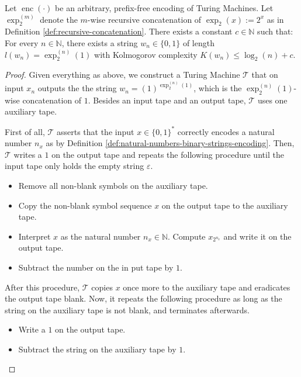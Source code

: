 \begin{lemma}
	\label{lemma:arbitrarycompress}
	Let $\operatorname{enc}(\cdot)$ be an arbitrary, prefix-free encoding of Turing Machines.
	Let $\exp_2^{(m)}$ denote the $m$-wise recursive concatenation of $\exp_2(x):=2^x$ as in Definition \ref{def:recursive-concatenation}.
	There exists a constant $c\in\mathbb{N}$ such that:
	For every $n\in\mathbb{N}$, there exists a string $w_n\in\{0,1\}$ of length $l(w_n)=\exp_2^{(n)}(1)$ with Kolmogorov complexity $K(w_n)\leq \log_2(n) + c$.
\end{lemma}
\begin{proof}
	Given everything as above, we construct a Turing Machine $\mathcal{T}$ that on input $x_n$ outputs the the string $w_n=(1)^{\exp_2^{(n)}(1)}$, which is the $\exp_2^{(n)}(1)$-wise concatenation of $1$. 
	Besides an input tape and an output tape, $\mathcal{T}$ uses one auxiliary tape.
	
	First of all, $\mathcal{T}$ asserts that the input $x\in\{0,1\}^{*}$ correctly encodes a natural number $n_x$ as by Definition \ref{def:natural-numbers-binary-strings-encoding}.
	Then, $\mathcal{T}$ writes a $1$ on the output tape and repeats the following procedure until the input tape only holds the empty string $\varepsilon$.
	
	\begin{itemize}
		\item Remove all non-blank symbols on the auxiliary tape.
		\item Copy the non-blank symbol sequence $x$ on the output tape to the auxiliary tape.
		\item Interpret $x$ as the natural number $n_x\in\mathbb{N}$. Compute $x_{2^{n_x}}$ and write it on the output tape.
		\item Subtract the number on the in
		put tape by $1$.
	\end{itemize}
	
	After this procedure, $\mathcal{T}$ copies $x$ once more to the auxiliary tape and eradicates the output tape blank. 
	Now, it repeats the following procedure as long as the string on the auxiliary tape is not blank, and terminates afterwards.
	\begin{itemize}
		\item Write a $1$ on the output tape.
		\item Subtract the string on the auxiliary tape by $1$.	
	\end{itemize}
	

\end{proof}
